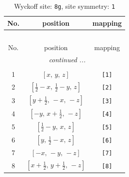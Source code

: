 \documentclass[fleqn,8pt]{jsarticle}
\begin{document}
\renewcommand{\arraystretch}{1.2}
\begin{longtable}{ccc}
\caption{Wyckoff site: {\tt 8g}, site symmetry: {\tt 1}}
 \\
 \hline \hline
No. & position & mapping \\ \hline \endfirsthead

\multicolumn{2}{l}{\tablename\ \thetable{}} \\
 \hline \hline
No. & position & mapping \\ \hline \endhead

 \hline \hline
\multicolumn{2}{r}{\footnotesize\it continued ...} \\ \endfoot

 \hline \hline
\multicolumn{2}{r}{} \\ \endlastfoot

1 & $\left[ x,\, y,\, z \right]$ & {\tt [1]} \\ \hline
2 & $\left[ \frac{1}{2} - x,\, \frac{1}{2} - y,\, z \right]$ & {\tt [2]} \\ \hline
3 & $\left[ y + \frac{1}{2},\, - x,\, - z \right]$ & {\tt [3]} \\ \hline
4 & $\left[ - y,\, x + \frac{1}{2},\, - z \right]$ & {\tt [4]} \\ \hline
5 & $\left[ \frac{1}{2} - y,\, x,\, z \right]$ & {\tt [5]} \\ \hline
6 & $\left[ y,\, \frac{1}{2} - x,\, z \right]$ & {\tt [6]} \\ \hline
7 & $\left[ - x,\, - y,\, - z \right]$ & {\tt [7]} \\ \hline
8 & $\left[ x + \frac{1}{2},\, y + \frac{1}{2},\, - z \right]$ & {\tt [8]} \\
\end{longtable}
\end{document}

